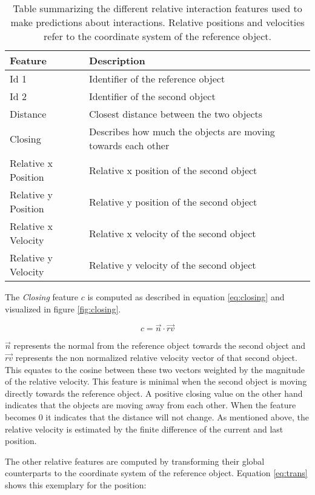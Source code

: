 \begin{table}
	\centering
	\begin{tabular*}{\textwidth}{@{\extracolsep{\fill} } l l}
		\hline \textbf{Feature} & \textbf{Description} \\ 
		\hline \hline 
		 Id 1 & Identifier of the reference object \\ 
		 Id 2 & Identifier of the second object \\ 
		 Distance & Closest distance between the two objects \\
		 Closing & Describes how much the objects are moving towards each other \\
		 Relative x Position & Relative x position of the second object \\
		 Relative y Position & Relative y position of the second object \\
		 Relative x Velocity & Relative x velocity of the second object \\
		 Relative y Velocity & Relative y velocity of the second object \\
		\hline 
	\end{tabular*} 
	\caption{Table summarizing the different relative interaction features used to make predictions about interactions. Relative positions and velocities refer to the coordinate system of the reference object.}
	\label{tab:gateInteractionFeatures}
\end{table}

The \textit{Closing} feature $c$ is computed as described in equation \ref{eq:closing} and visualized in figure \ref{fig:closing}.

\begin{equation}
  c = \vec{n} \cdot \vec{rv}
 \label{eq:closing}
\end{equation}

$\vec{n}$ represents the normal from the reference object towards the second object and $\vec{rv}$ represents the non normalized relative velocity vector of that second object. This equates to the cosine between these two vectors weighted by the magnitude of the relative velocity. This feature is minimal when the second object is moving directly towards the reference object. A positive closing value on the other hand indicates that the objects are moving away from each other. When the feature becomes 0 it indicates that the distance will not change. As mentioned above, the relative velocity is estimated by the finite difference of the current and last position.

The other relative features are computed by transforming their global counterparts to the coordinate system of the reference object. Equation \ref{eq:trans} shows this exemplary for the position:

